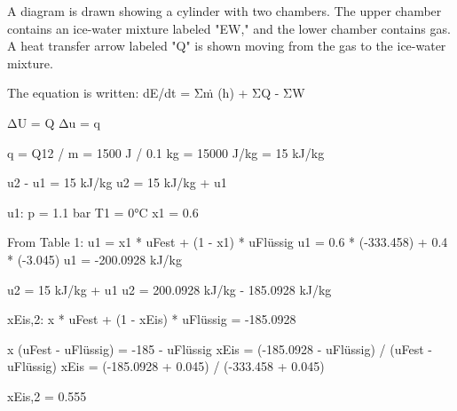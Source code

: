 A diagram is drawn showing a cylinder with two chambers. The upper chamber contains an ice-water mixture labeled "EW," and the lower chamber contains gas. A heat transfer arrow labeled "Q" is shown moving from the gas to the ice-water mixture.

The equation is written:
dE/dt = Σṁ (h) + ΣQ - ΣW

ΔU = Q  
Δu = q  

q = Q12 / m = 1500 J / 0.1 kg = 15000 J/kg = 15 kJ/kg  

u2 - u1 = 15 kJ/kg  
u2 = 15 kJ/kg + u1  

u1:  
p = 1.1 bar  
T1 = 0°C  
x1 = 0.6  

From Table 1:  
u1 = x1 * uFest + (1 - x1) * uFlüssig  
u1 = 0.6 * (-333.458) + 0.4 * (-3.045)  
u1 = -200.0928 kJ/kg  

u2 = 15 kJ/kg + u1  
u2 = 200.0928 kJ/kg - 185.0928 kJ/kg  

xEis,2:  
x * uFest + (1 - xEis) * uFlüssig = -185.0928  

x (uFest - uFlüssig) = -185 - uFlüssig  
xEis = (-185.0928 - uFlüssig) / (uFest - uFlüssig)  
xEis = (-185.0928 + 0.045) / (-333.458 + 0.045)  

xEis,2 = 0.555
